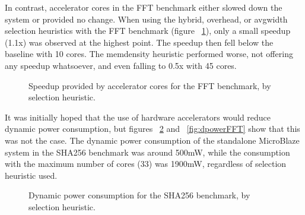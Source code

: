\documentclass{UoYCSproject}
\begin{document}
In contrast, accelerator cores in the FFT benchmark either slowed down the system or provided no change.
When using the hybrid, overhead, or avgwidth selection heuristics with the FFT benchmark (figure ~\ref{fig:speedupFFT}),
only a small speedup (1.1x) was observed at the highest point. The speedup then fell below the baseline with 10 cores.
The memdensity heuristic performed worse, not offering any speedup whatsoever, and even falling to 0.5x with 45 cores.

\begin{figure}[H]
\caption{Speedup provided by accelerator cores for the FFT benchmark, by selection heuristic.}
\label{fig:speedupFFT}
\end{figure}

It was initially hoped that the use of hardware accelerators
would reduce dynamic power consumption, but figures ~\ref{fig:dpowerSHA256} and ~\ref{fig:dpowerFFT}
show that this was not the case. The dynamic power consumption of the standalone MicroBlaze system
in the SHA256 benchmark was around 500mW, while the consumption with the maximum number of cores
(33) was 1900mW, regardless of selection heuristic used.

\begin{figure}[H]
\caption{Dynamic power consumption for the SHA256 benchmark, by selection heuristic.}
\label{fig:dpowerSHA256}
\end{figure}
\end{document}
